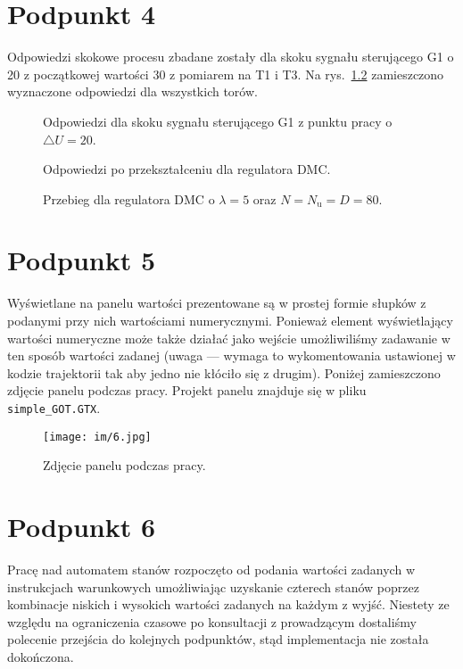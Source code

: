 \chapter{Podpunkt 4}
Odpowiedzi skokowe procesu zbadane zostały dla skoku sygnału sterującego G1 o 20 z początkowej wartości 30 z pomiarem na T1 i T3. Na rys.~\ref{Z4step} zamieszczono wyznaczone odpowiedzi dla wszystkich torów.

\begin{figure}[ht]
\centering

\caption{Odpowiedzi dla skoku sygnału sterującego G1 z punktu pracy o $\triangle U = 20$.}
\label{Z4steps}
\end{figure}

\begin{figure}[ht]
\centering

\caption{Odpowiedzi po przekształceniu dla regulatora DMC.}
\label{Z4step}
\end{figure}

\begin{figure}[ht]
\centering

\caption{Przebieg dla regulatora DMC o $\lambda = 5$ oraz $N = N_\mathrm{u} = D = 80$.}
\label{Z4DMCfinal}
\end{figure}

\chapter{Podpunkt 5}
Wyświetlane na panelu wartości prezentowane są w prostej formie słupków z podanymi przy nich wartościami numerycznymi. Ponieważ element wyświetlający wartości numeryczne może także działać jako wejście umożliwiliśmy zadawanie w ten sposób wartości zadanej (uwaga --- wymaga to wykomentowania ustawionej w kodzie trajektorii tak aby jedno nie kłóciło się z drugim). Poniżej zamieszczono zdjęcie panelu podczas pracy. Projekt panelu znajduje się w pliku \verb+simple_GOT.GTX+.

\begin{figure}[ht]
\centering
\texttt{[image: im/6.jpg]}
\caption{Zdjęcie panelu podczas pracy.}
\end{figure}

\chapter{Podpunkt 6}
Pracę nad automatem stanów rozpoczęto od podania wartości zadanych w instrukcjach warunkowych umożliwiając uzyskanie czterech stanów poprzez kombinacje niskich i wysokich wartości zadanych na każdym z wyjść. Niestety ze względu na ograniczenia czasowe po konsultacji z prowadzącym dostaliśmy polecenie przejścia do kolejnych podpunktów, stąd implementacja nie została dokończona.

